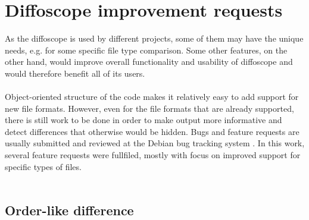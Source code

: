 \section{Diffoscope improvement requests}


As the diffoscope is used by different projects, some of them may have the unique needs, e.g. for some specific file type comparison.
Some other features, on the other hand, would improve overall functionality and usability of diffoscope and would therefore benefit all of its users.\\\\
Object-oriented structure of the code makes it relatively easy to add support for
new file formats.
However, even for the file formats that are already supported, there is still work
to be done in order to make output more informative and detect differences that
otherwise would be hidden.
Bugs and feature requests are usually submitted and reviewed at the Debian bug tracking system \autocite{dfs-bugs}.
In this work, several feature requests were fullfiled, mostly with focus on improved support for specific types of files.\\\\


\subsection[Order-like difference]{Order-like difference}

